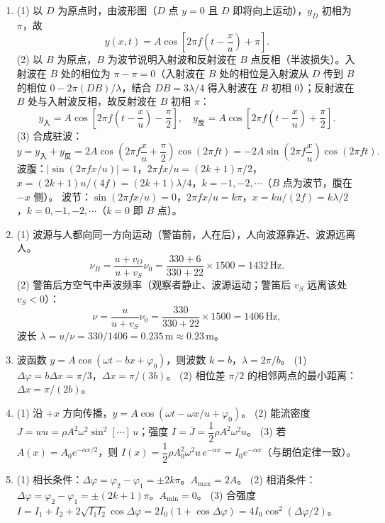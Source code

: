 \documentclass[12pt]{article}
\begin{document}
\begin{enumerate}[label=\textbf{例\arabic*.}, leftmargin=*]
\item (1) 以 $D$ 为原点时，由波形图（$D$ 点 $y=0$ 且 $D$ 即将向上运动），$y_D$ 初相为 $\pi$，故
\[
  y(x,t) = A\cos\!\left[2\pi f\!\left(t-\frac{x}{u}\right)+\pi\right].
\]
(2) 以 $B$ 为原点，$B$ 为波节说明入射波和反射波在 $B$ 点反相（半波损失）。入射波在 $B$ 处的相位为 $\pi-\pi = 0$（入射波在 $B$ 处的相位是入射波从 $D$ 传到 $B$ 的相位 $0-2\pi(DB)/\lambda$，结合 $DB=3\lambda/4$ 得入射波在 $B$ 初相 $0$）；反射波在 $B$ 处与入射波反相，故反射波在 $B$ 初相 $\pi$：
\[
  y_{\text{入}} = A\cos\!\left[2\pi f\!\left(t-\frac{x}{u}\right)-\frac{\pi}{2}\right],\quad
  y_{\text{反}} = A\cos\!\left[2\pi f\!\left(t-\frac{x}{u}\right)+\frac{\pi}{2}\right].
\]
(3) 合成驻波：
\[
  y = y_{\text{入}}+y_{\text{反}} = 2A\cos\!\left(2\pi f\frac{x}{u}+\frac{\pi}{2}\right)\cos(2\pi ft)
  = -2A\sin\!\left(2\pi f\frac{x}{u}\right)\cos(2\pi ft).
\]
波腹：$|\sin(2\pi fx/u)|=1$，$2\pi fx/u=(2k+1)\pi/2$，$x=(2k+1)u/(4f)=(2k+1)\lambda/4$，$k=-1,-2,\cdots$（$B$ 点为波节，腹在 $-x$ 侧）。
波节：$\sin(2\pi fx/u)=0$，$2\pi fx/u=k\pi$，$x=ku/(2f)=k\lambda/2$，$k=0,-1,-2,\cdots$（$k=0$ 即 $B$ 点）。

\item (1) 波源与人都向同一方向运动（警笛前，人在后），人向波源靠近、波源远离人。
\[
  \nu_R = \frac{u+v_O}{u+v_S}\nu_0 = \frac{330+6}{330+22}\times 1500 = 1432\,\mathrm{Hz}.
\]
(2) 警笛后方空气中声波频率（观察者静止、波源运动；警笛后 $v_S$ 远离该处 $v_S<0$）：
\[
  \nu = \frac{u}{u+v_S}\nu_0 = \frac{330}{330+22}\times 1500 = 1406\,\mathrm{Hz},
\]
波长 $\lambda = u/\nu = 330/1406 = 0.235\,\mathrm{m}\approx 0.23\,\mathrm{m}$。

\item 波函数 $y = A\cos(\omega t - bx + \varphi_0)$，则波数 $k=b$，$\lambda = 2\pi/b$。
(1) $\Delta\varphi = b\Delta x = \pi/3$，$\Delta x = \pi/(3b)$。
(2) 相位差 $\pi/2$ 的相邻两点的最小距离：$\Delta x = \pi/(2b)$。

\item (1) 沿 $+x$ 方向传播，$y = A\cos(\omega t - \omega x/u + \varphi_0)$。
(2) 能流密度 $J = wu = \rho A^2\omega^2\sin^2[\cdots]\,u$；强度 $I = \bar J = \dfrac{1}{2}\rho A^2\omega^2 u$。
(3) 若 $A(x) = A_0 e^{-\alpha x/2}$，则 $I(x) = \dfrac{1}{2}\rho A_0^2\omega^2 u\, e^{-\alpha x} = I_0 e^{-\alpha x}$（与朗伯定律一致）。

\item (1) 相长条件：$\Delta\varphi = \varphi_2-\varphi_1 = \pm 2k\pi$。$A_{\max} = 2A$。
(2) 相消条件：$\Delta\varphi = \varphi_2-\varphi_1 = \pm(2k+1)\pi$。$A_{\min} = 0$。
(3) 合强度 $I = I_1+I_2+2\sqrt{I_1I_2}\cos\Delta\varphi = 2I_0(1+\cos\Delta\varphi) = 4I_0\cos^2(\Delta\varphi/2)$。


\end{enumerate}
\end{document}
